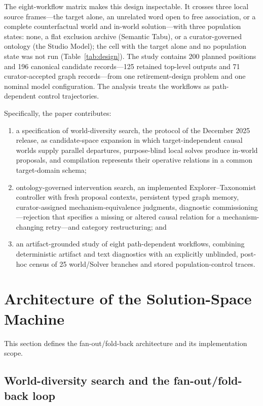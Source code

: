 \documentclass[11pt,a4paper]{article}
\begin{document}
The eight-workflow matrix makes this design inspectable. It crosses three local source frames---the target alone, an unrelated word open to free association, or a complete counterfactual world and in-world solution---with three population states: none, a flat exclusion archive (Semantic Tabu), or a curator-governed ontology (the Studio Model); the cell with the target alone and no population state was not run (Table~\ref{tab:design}). The study contains 200 planned positions and 196 canonical candidate records---125 retained top-level outputs and 71 curator-accepted graph records---from one retirement-design problem and one nominal model configuration. The analysis treats the workflows as path-dependent control trajectories.

Specifically, the paper contributes:

\begin{enumerate}
  \item a specification of world-diversity search, the protocol of the December 2025 release, as candidate-space expansion in which target-independent causal worlds supply parallel departures, purpose-blind local solves produce in-world proposals, and compilation represents their operative relations in a common target-domain schema;
  \item ontology-governed intervention search, an implemented Explorer--Taxonomist controller with fresh proposal contexts, persistent typed graph memory, curator-assigned mechanism-equivalence judgments, diagnostic commissioning---rejection that specifies a missing or altered causal relation for a mechanism-changing retry---and category restructuring; and
  \item an artifact-grounded study of eight path-dependent workflows, combining deterministic artifact and text diagnostics with an explicitly unblinded, post-hoc census of 25 world/Solver branches and stored population-control traces.
\end{enumerate}

\section{Architecture of the Solution-Space Machine}

This section defines the fan-out/fold-back architecture and its implementation scope.

\subsection{World-diversity search and the fan-out/fold-back loop}
\label{sec:world-diversity}
\end{document}
